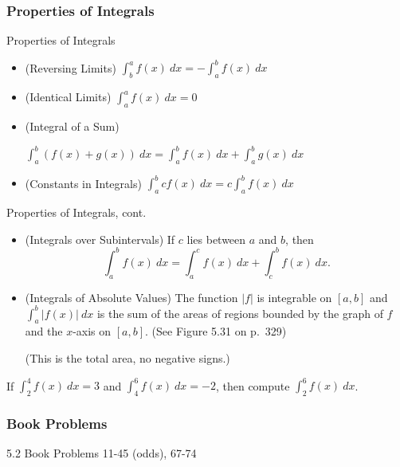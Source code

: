 \documentclass[cal1spr16Lectures.tex]{subfiles}
\begin{document}
\subsubsection{Properties of Integrals}

\begin{frame}{\small Properties of Integrals}\footnotesize
\begin{itemize}
\item[1.] (Reversing Limits) $\int_b^a f(x)\ dx = -\int_a^b f(x)\ dx$

\vspace{0.75pc}
\item[2.] (Identical Limits) $\int_a^a f(x)\ dx = 0$

\vspace{0.75pc}
\item[3.] (Integral of a Sum) 

$\int_a^b (f(x)+g(x))\ dx = \int_a^b f(x)\ dx + \int_a^b g(x)\ dx$

\vspace{0.75pc}
\item[4.] (Constants in Integrals) $\int_a^b cf(x)\ dx = c \int_a^b f(x)\ dx$
\end{itemize}
\end{frame}

\begin{frame}{\small Properties of Integrals, cont.}\footnotesize
\begin{itemize}
\item[5.] (Integrals over Subintervals) If $c$ lies between $a$ and $b$, then
\[
\int_a^b f(x)\ dx = \int_a^c f(x)\ dx + \int_c^b f(x)\ dx.
\]

\item[6.] (Integrals of Absolute Values) The function $|f|$ is integrable on $[a,b]$ and $\int_a^b |f(x)|\ dx$ is the sum of the areas of regions bounded by the graph of $f$ and the $x$-axis on $[a,b]$.  (See Figure 5.31 on p.\ 329) 

\vspace{0.5pc}
\alert{(This is the total area, no negative signs.)}
\end{itemize}
\end{frame}

\begin{frame}\small
\begin{exe} 
If $\int_2^4 f(x)\ dx = 3$ and $\int_4^6 f(x)\ dx = -2$, then compute 
$\int_2^6 f(x)\ dx$. 
\end{exe}
\end{frame}

\subsubsection{Book Problems}

\begin{frame}
\begin{block}{5.2 Book Problems}
11-45 (odds), 67-74
\end{block}
\end{frame}


\end{document}
